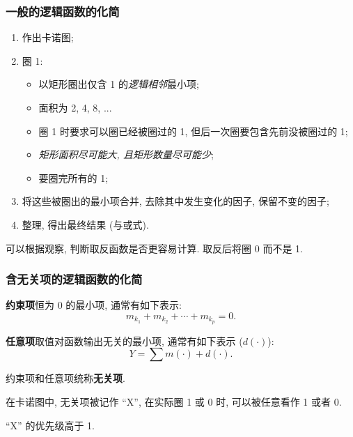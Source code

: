 \subsubsection{一般的逻辑函数的化简}
\begin{enumerate}
    \item 作出卡诺图;
    \item 圈 1:
          \begin{itemize}
              \item 以矩形圈出仅含 1 的\textit{逻辑相邻}最小项;
              \item 面积为 2, 4, 8, ...
              \item 圈 1 时要求可以圈已经被圈过的 1, 但后一次圈要包含先前没被圈过的 1;
              \item \textit{矩形面积尽可能大, 且矩形数量尽可能少};
              \item 要圈完所有的 1;
          \end{itemize}
    \item 将这些被圈出的最小项合并, 去除其中发生变化的因子, 保留不变的因子;
    \item 整理, 得出最终结果 (与或式).
\end{enumerate}

可以根据观察, 判断取反函数是否更容易计算. 取反后将圈 0 而不是 1.

\subsubsection{含无关项的逻辑函数的化简}
\textbf{约束项}\quad 恒为 0 的最小项, 通常有如下表示:
\begin{equation*}
    m_{k_1}+m_{k_2}+\cdots+m_{k_p}=0.
\end{equation*}

\textbf{任意项}\quad 取值对函数输出无关的最小项, 通常有如下表示 ($d(\cdot)$):
\begin{equation*}
    Y=\sum m(\cdot)+d(\cdot).
\end{equation*}

约束项和任意项统称\textbf{无关项}.

在卡诺图中, 无关项被记作 ``X'', 在实际圈 1 或 0 时, 可以被任意看作 1 或者 0.

``X'' 的优先级高于 1.
